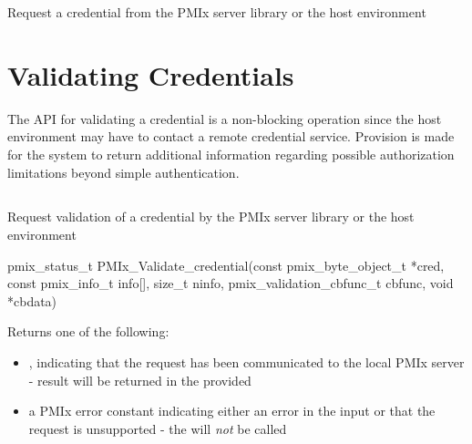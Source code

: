 \descr

Request a credential from the \ac{PMIx} server library or the host environment

\section{Validating Credentials}
\label{chap:api_security:validate}

The \ac{API} for validating a credential is a non-blocking operation since the host environment may have to contact a remote credential service. Provision is made for the system to return additional information regarding possible authorization limitations beyond simple authentication.

\subsection{}

\summary

Request validation of a credential by the \ac{PMIx} server library or the host environment

\format

\cspecificstart
\begin{codepar}
pmix_status_t
PMIx_Validate_credential(const pmix_byte_object_t *cred,
                         const pmix_info_t info[], size_t ninfo,
                         pmix_validation_cbfunc_t cbfunc,
                         void *cbdata)
\end{codepar}
\cspecificend

\begin{arglist}
\end{arglist}

Returns one of the following:

\begin{itemize}
    \item {}, indicating that the request has been communicated to the local \ac{PMIx} server - result will be returned in the provided 
    \item a \ac{PMIx} error constant indicating either an error in the input or that the request is unsupported - the  will \textit{not} be called
\end{itemize}

